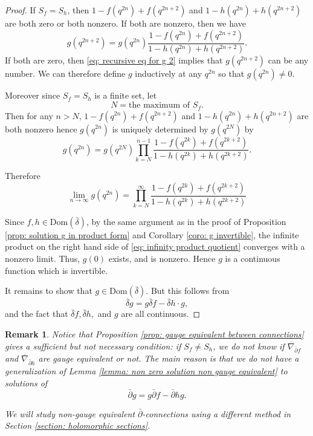 \documentclass[12pt]{article}
\newtheorem{remark}[definition]{Remark}
\numberwithin{equation}{section}
\def\Dom{{\mathrm {Dom}}}
\def\pb{\bar{\partial}}
\def\db{\bar{\delta}}
\def\d{\bar{\delta}}
\begin{document}
\begin{proof}
    If $S_f= S_h$, then $1 - f(q^{2n}) + f(q^{2n+2})$ and $1 - h(q^{2n}) + h(q^{2n+2})$ are both zero or both nonzero. If both are nonzero, then we have 
    \begin{equation}
    g(q^{2n+2})=g(q^{2n})\frac{1 - f(q^{2n}) + f(q^{2n+2})}{1 - h(q^{2n}) + h(q^{2n+2})}.
    \end{equation}
    If both are zero, then \eqref{eq: recursive eq for g 2} implies that $g(q^{2n+2})$ can be any number. We can therefore define $g$ inductively at any $q^{2n}$ so that $g(q^{2n})\neq 0$.

    

   Moreover since $S_f=S_h$ is a finite set, let 
   $$
   N= \text{the maximum of }S_f.
   $$
Then for any $n>N$, $1 - f(q^{2n}) + f(q^{2n+2})$ and $1 - h(q^{2n}) + h(q^{2n+2})$ are both nonzero hence $g(q^{2n})$ is uniquely determined by $g(q^{2N})$ by
\begin{equation}
    g(q^{2n}) = g(q^{2N})\prod_{k=N}^{n-1} \frac{1 - f(q^{2k}) + f(q^{2k+2})}{1 - h(q^{2k}) + h(q^{2k+2})} .
    \end{equation}

    Therefore
  \begin{equation}\label{eq: infinity product quotient}
    \lim_{n \to \infty} g(q^{2n}) 
  =\prod_{k = N }^{\infty}  \frac{1 - f(q^{2k}) + f(q^{2k + 2})}{1 - h(q^{2k}) + h(q^{2k + 2})}
    \end{equation}

   Since $f,h\in \Dom(\db)$, by the same argument as in the proof of Proposition \ref{prop: solution g in product form} and Corollary \ref{coro: g invertible}, the infinite product on the right hand side of \eqref{eq: infinity product quotient} converges with a nonzero limit. Thus, $g(0)$ exists, and is nonzero.
   Hence $g$ is a continuous function which is invertible.
    
    It remains to show that $g\in \Dom(\db)$. But this  follows from \[
    \d g = g \d f - \d h \cdot g,
    \]
    and the fact that $\d f, \d h,$ and $g$ are all continuous.
\end{proof}

\begin{remark}
    Notice that Proposition \ref{prop: gauge equivalent between connections} gives a sufficient but not necessary condition: if $S_f\neq S_h$, we do not know if $\overline{\nabla}_{\pb f}$ and $\overline{\nabla}_{\pb h}$ are gauge equivalent or not. The main reason is that we do not have a generalization of Lemma \ref{lemma: non zero solution non gauge equivalent} to solutions of
    $$
    \pb g=g \pb f-\pb h g.
    $$

    We will study non-gauge equivalent $\pb$-connections using a different method in Section \ref{section: holomorphic sections}.
\end{remark}
\end{document}
